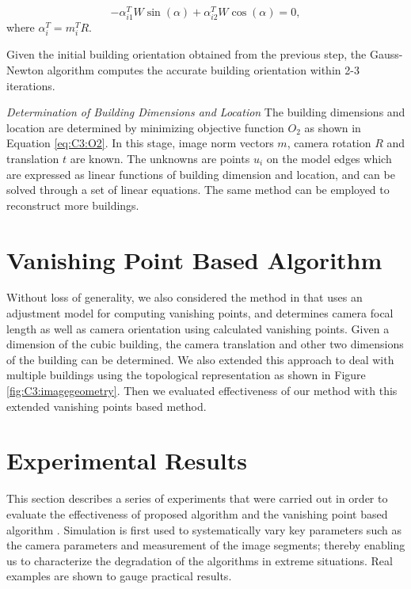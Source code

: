 \begin{equation}
  -\alpha_{i1}^TW\sin(\alpha) + \alpha_{i2}^TW\cos(\alpha) = 0,
\label{eq:C3:RBO}
\end{equation} 
where $\alpha_i^T = m_i^TR$.

Given the initial building orientation obtained from the previous step, the Gauss-Newton algorithm computes the accurate building orientation within 2-3 iterations.

{\it Determination of Building Dimensions and Location} The building dimensions and location are determined by minimizing objective function $O_2$ as shown in Equation \ref{eq:C3:O2}. In this stage, image norm vectors $m$, camera rotation $R$ and translation $t$ are known. The unknowns are points $u_i$ on the model edges which are expressed as linear functions of building dimension and location, and can be solved through a set of linear equations. The same method can be employed to reconstruct more buildings.

\section{Vanishing Point Based Algorithm}

Without loss of generality, we also considered the method in \cite{ZhangZ01} that uses an adjustment model for computing vanishing points, and determines camera focal length as well as camera orientation using calculated vanishing points. Given a dimension of the cubic building, the camera translation and other two dimensions of the building can be determined. We also extended this approach to deal with multiple buildings using the topological representation as shown in Figure \ref{fig:C3:imagegeometry}. Then we evaluated effectiveness of our method with this extended vanishing points based method. 

\section{Experimental Results}

This section describes a series of experiments that were carried out in order to evaluate the effectiveness of proposed algorithm and the vanishing point based algorithm \cite{ZhangZ01}. Simulation is first used to systematically vary key parameters such as the camera parameters and measurement of the image segments; thereby enabling us to characterize the degradation of the algorithms in
extreme situations. Real examples are shown to gauge practical results.

